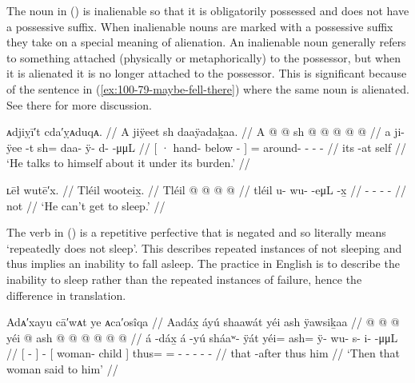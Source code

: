 The noun  in (\lastx) is inalienable so that it is obligatorily possessed and does not have a possessive suffix.
When inalienable nouns are marked with a possessive suffix they take on a special meaning of alienation.
An inalienable noun generally refers to something attached (physically or metaphorically) to the possessor, but when it is alienated it is no longer attached to the possessor.
This is significant because of the sentence in (\ref{ex:100-79-maybe-fell-there}) where the same noun is alienated.
See there for more discussion.

\ex\label{ex:100-75-talk-self-burden}%
%
\begingl
	\glpreamble	ᴀdjiỵī′t cda′ỵᴀduqᴀ. //
	\glpreamble	A jiÿeet sh daaÿadaḵaa. //
	\gla	{} A  @ {} @ {} {} 
		sh @  @ {} @ {} @ {} @ {} //
	\glb	{} a ji- ÿee -t {} 
		sh= daa- ÿ- d-  -μμL //
	\glc	{}[ · hand- below - {}]
		= around- - -  - //
	\gld	{} its  {} -at {}
		self  {} {} {} {} //
	\glft	‘He talks to himself about it under its burden.’
		//
\endgl
\xe

\ex\label{ex:100-76-cant-sleep}%
%
\begingl
	\glpreamble	ʟēł wutē′x. //
	\glpreamble	Tléil wooteix̱. //
	\gla	Tléil  @ {} @ {} @ {} @ {} //
	\glb	tléil u- wu-  -eμL -x̱ //
	\glc	{} - -  - - //
	\gld	not  {} {} {} {} //
	\glft	‘He can’t get to sleep.’
		//
\endgl
\xe

The verb in (\lastx) is a repetitive perfective that is negated and so literally means ‘repeatedly does not sleep’.
This describes repeated instances of not sleeping and thus implies an inability to fall asleep.
The practice in English is to describe the inability to sleep rather than the repeated instances of failure, hence the difference in translation.

\ex\label{ex:100-77-woman-tells-him}%
%
\begingl
	\glpreamble	Adᴀ′xayu cā′wᴀt ye ᴀca′osîqa //
	\glpreamble	Aadáx̱ áyú shaawát yéi ash ÿawsiḵaa //
	\gla	{}  @ {} {}  @ {} 
		{}  @ {} {}
		yéi @ ash @  @ {} @ {} @ {} @ {} @ {} //
	\glb	{} á -dáx̱ {} á -yú 
		{} sháaʷ- ÿát {} yéi= ash= ÿ- wu- s- i-  -μμL //
	\glc	{}[  - {}]  - 
		{}[ woman- child {}]
		thus= = - - - -  - //
	\gld	{} that -after {}  {} 
		{}  {} {}
		thus him  {} {} {} {} {} //
	\glft	‘Then that woman said to him’
		//
\endgl
\xe

